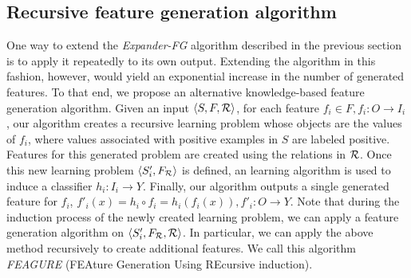\documentclass[letterpaper]{article} %
\theoremstyle{definition}
\begin{document}
\subsection{Recursive feature generation algorithm}
\label{algorithm_section}
One way to extend the \emph{Expander-FG} algorithm described in the previous section is to apply it repeatedly to its own output.
Extending the algorithm in this fashion, however, would yield an exponential increase in the number of generated features.
To that end, we propose an alternative knowledge-based feature generation algorithm. Given an input $\langle S,F,{\cal R} \rangle$, for each feature $f_i\in F, f_i:O\rightarrow I_i$, our algorithm creates a recursive learning problem whose objects are the values of $f_i$, where values associated with positive examples in $S$ are labeled positive. %
Features for this generated problem are created using the relations in ${\cal R}$. Once this new learning problem $\langle S'_i,F_{\cal R}\rangle$ is defined, an learning algorithm is used to induce a classifier $h_i:I_i\rightarrow Y$. Finally, our algorithm outputs a single generated feature for $f_i$, $f'_i(x)=h_i\circ f_i=h_i(f_i(x)), f'_i:O\rightarrow Y$.
Note that during the induction process of the newly created learning problem, we can apply a feature generation algorithm on $\langle S'_i,F_{\cal R},{\cal R} \rangle$. In particular, we can apply the above method recursively to create additional features. We call this algorithm \emph{FEAGURE} (FEAture Generation Using REcursive induction).

\end{document}
